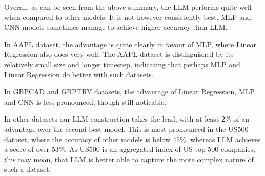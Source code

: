 Overall, as can be seen from the above summary, the LLM performs quite well when compared to other models. It is not however consistently best. MLP and CNN models sometimes manage to achieve higher accuracy than LLM.

In AAPL dataset, the advantage is quite clearly in favour of MLP, where Linear Regression also does very well. The AAPL dataset is distinguished by its relatively small size and longer timestep, indicating that perhaps MLP and Linear Regression do better with such datasets.

In GBPCAD and GBPTRY datasets, the advantage of Linear Regression, MLP and CNN is less pronounced, though still noticable.

In other datasets our LLM construction takes the lead, with at least 2\% of an advantage over the second best model. This is most pronounced in the US500 dataset, where the accuracy of other models is below 45\%, whereas LLM achieves a score of over 53\%. As US500 is an aggregated index of US top 500 companies, this may mean, that LLM is better able to capture the more complex nature of such a dataset.

